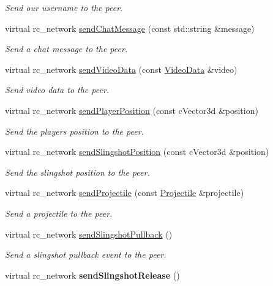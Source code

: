 \begin{DoxyCompactItemize}
\begin{DoxyCompactList}\small\item\em Send our username to the peer. \item\end{DoxyCompactList}\item 
virtual rc\_\-network \hyperlink{classNetworkReplayer_a689bc26f935bb0d7f72d3f69cea6e98c}{sendChatMessage} (const std::string \&message)
\begin{DoxyCompactList}\small\item\em Send a chat message to the peer. \item\end{DoxyCompactList}\item 
virtual rc\_\-network \hyperlink{classNetworkReplayer_ab7f69701316a3387da91d2146ea97b5e}{sendVideoData} (const \hyperlink{structVideoData}{VideoData} \&video)
\begin{DoxyCompactList}\small\item\em Send video data to the peer. \item\end{DoxyCompactList}\item 
virtual rc\_\-network \hyperlink{classNetworkReplayer_a7c9a5203b80840fee0157d506ff14f61}{sendPlayerPosition} (const cVector3d \&position)
\begin{DoxyCompactList}\small\item\em Send the players position to the peer. \item\end{DoxyCompactList}\item 
virtual rc\_\-network \hyperlink{classNetworkReplayer_ad8ad840c17aa86b890857ef714eb019a}{sendSlingshotPosition} (const cVector3d \&position)
\begin{DoxyCompactList}\small\item\em Send the slingshot position to the peer. \item\end{DoxyCompactList}\item 
virtual rc\_\-network \hyperlink{classNetworkReplayer_a7ebdbb74bb8e3b1fdc877d3c8157d342}{sendProjectile} (const \hyperlink{classProjectile}{Projectile} \&projectile)
\begin{DoxyCompactList}\small\item\em Send a projectile to the peer. \item\end{DoxyCompactList}\item 
virtual rc\_\-network \hyperlink{classNetworkReplayer_a98342ea3e802e9108b6d3329d977eade}{sendSlingshotPullback} ()
\begin{DoxyCompactList}\small\item\em Send a slingshot pullback event to the peer. \item\end{DoxyCompactList}\item 
\hypertarget{classNetworkReplayer_a8bc7c3c55dd7f7227d63335206a905a0}{
virtual rc\_\-network {\bfseries sendSlingshotRelease} ()}
\label{classNetworkReplayer_a8bc7c3c55dd7f7227d63335206a905a0}


\end{DoxyCompactItemize}
